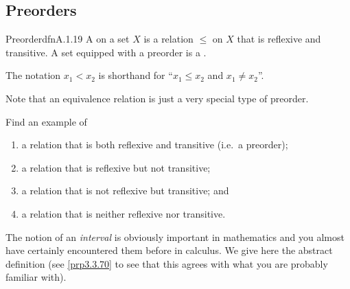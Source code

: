\subsection{Preorders}

\begin{dfn}{Preorder}{dfnA.1.19}
A  on a set $X$ is a relation $\leq$ on $X$ that is reflexive and transitive.  A set equipped with a preorder is a .
\begin{rmk}
The notation $x_1<x_2$ is shorthand for ``$x_1\leq x_2$ and $x_1\neq x_2$''.
\end{rmk}
\begin{rmk}
Note that an equivalence relation is just a very special type of preorder.
\end{rmk}
\end{dfn}
\begin{exr}{}{}
Find an example of
\begin{enumerate}
\item a relation that is both reflexive and transitive (i.e.~a preorder);
\item a relation that is reflexive but not transitive;
\item a relation that is not reflexive but transitive; and
\item a relation that is neither reflexive nor transitive.
\end{enumerate}
\end{exr}
The notion of an \emph{interval} is obviously important in mathematics and you almost have certainly encountered them before in calculus.  We give here the abstract definition (see \cref{prp3.3.70} to see that this agrees with what you are probably familiar with).
